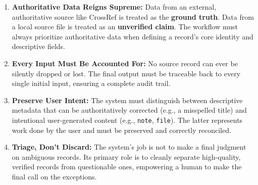 \documentclass[11pt, a4paper]{article}
\begin{document}
\begin{enumerate}[label=\arabic*.]
    \item \textbf{Authoritative Data Reigns Supreme:} Data from an external, authoritative source like CrossRef is treated as the \textbf{ground truth}. Data from a local source file is treated as an \textbf{unverified claim}. The workflow must always prioritize authoritative data when defining a record's core identity and descriptive fields.

    \item \textbf{Every Input Must Be Accounted For:} No source record can ever be silently dropped or lost. The final output must be traceable back to every single initial input, ensuring a complete audit trail.

    \item \textbf{Preserve User Intent:} The system must distinguish between descriptive metadata that can be authoritatively corrected (e.g., a misspelled title) and intentional user-generated content (e.g., \texttt{note}, \texttt{file}). The latter represents work done by the user and must be preserved and correctly reconciled.

    \item \textbf{Triage, Don't Discard:} The system’s job is not to make a final judgment on ambiguous records. Its primary role is to cleanly separate high-quality, verified records from questionable ones, empowering a human to make the final call on the exceptions.
\end{enumerate}
\end{document}
